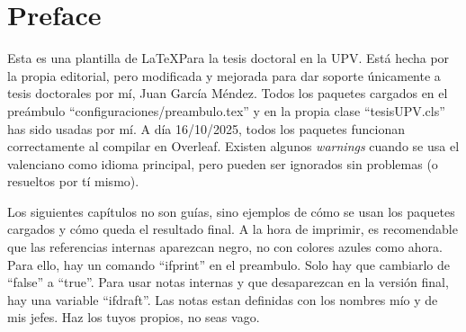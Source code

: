 \chapter*{Preface}

Esta es una plantilla de \LaTeX Para la tesis doctoral en la UPV. Está hecha por la propia editorial, pero modificada y mejorada para dar soporte únicamente a tesis doctorales por mí, Juan García Méndez. Todos los paquetes cargados en el preámbulo ``configuraciones/preambulo.tex'' y en la propia clase ``tesisUPV.cls'' has sido usadas por mí. A día 16/10/2025, todos los paquetes funcionan correctamente al compilar en Overleaf. Existen algunos \textit{warnings} cuando se usa el valenciano como idioma principal, pero pueden ser ignorados sin problemas (o resueltos por tí mismo).

Los siguientes capítulos no son guías, sino ejemplos de cómo se usan los paquetes cargados y cómo queda el resultado final. A la hora de imprimir, es recomendable que las referencias internas aparezcan negro, no con colores azules como ahora. Para ello, hay un comando ``ifprint'' en el preambulo. Solo hay que cambiarlo de ``false'' a ``true''. Para usar notas internas y que desaparezcan en la versión final, hay una variable ``ifdraft''. Las notas estan definidas con los nombres mío y de mis jefes. Haz los tuyos propios, no seas vago.